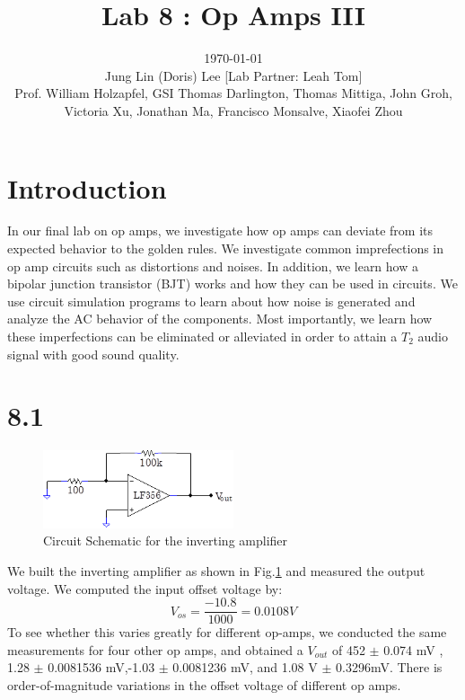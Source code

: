 \documentclass[authoryear, 12pt,5p, times]{elsarticle}
\begin{document}
\begin{frontmatter}
\title{Lab 8 : Op Amps III}
\author{\today \quad \\Jung Lin (Doris) Lee [Lab Partner: Leah Tom]\\Prof. William Holzapfel, GSI Thomas Darlington, Thomas Mittiga, John Groh,  \\Victoria Xu, Jonathan Ma, Francisco Monsalve, Xiaofei Zhou\vspace{-45pt}}	 
\end{frontmatter}
\section*{Introduction\label{intro}}
In our final lab on op amps, we investigate how op amps can deviate from its expected behavior to the golden rules. We investigate common imprefections in op amp circuits such as distortions and noises. In addition, we learn how a bipolar junction transistor (BJT) works  and how they can be used in circuits. We use circuit simulation programs to learn about how noise is generated and analyze the AC behavior of the components. Most importantly, we learn how these imperfections can be eliminated or alleviated in order to attain a $T_2$ audio signal with good sound quality.
 \section*{8.1}
 \begin{figure}[h!]
 \centering
 \includegraphics[width=0.5\textwidth]{figure/8_1_schema.png}
\caption{Circuit Schematic for the inverting amplifier}
\label{8_1_schema}
 \end{figure}
We built the inverting amplifier as shown in Fig.\ref{8_1_schema}  and measured the output voltage. We computed the input offset voltage by: 
\begin{equation}
V_{os}  = \frac{-10.8}{1000}  = 0.0108 V
\end{equation} To see whether this varies greatly for different op-amps, we conducted the same measurements for four other op amps, and obtained a $V_{out}$ of 452 $\pm$ 0.074 mV , 1.28 $\pm$ 0.0081536 mV,-1.03 $\pm$ 0.0081236 mV, and 1.08 V $\pm$ 0.3296mV. There is order-of-magnitude variations in the offset voltage of different op amps.
\end{document}

